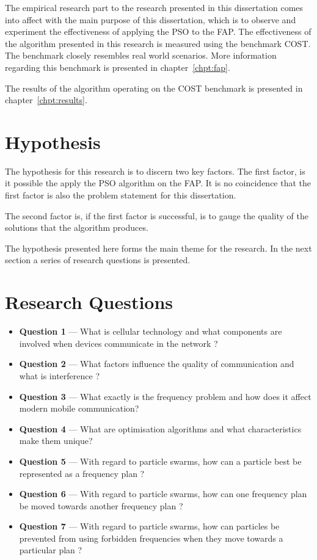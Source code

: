 The empirical research part to the research presented in this dissertation comes into affect with the main purpose of this dissertation, which is to observe and experiment the effectiveness of applying the \gls{PSO} to the \gls{FAP}. The effectiveness of the algorithm presented in this research is measured using the benchmark \gls{COST}. The benchmark closely resembles real world scenarios. More information regarding this benchmark is presented in chapter~\ref{chpt:fap}.

The results of the algorithm operating on the \gls{COST} benchmark is presented in chapter~\ref{chpt:results}. 
\section{Hypothesis}
The hypothesis for this research is to discern two key factors. The first factor, is it possible the apply the \gls{PSO} algorithm on the \gls{FAP}. It is no coincidence that the first factor is also the problem statement for this dissertation.

The second factor is, if the first factor is successful, is to gauge the quality of the solutions that the algorithm produces.

The hypothesis presented here forms the main theme for the research. In the next section a series of research questions is presented.
\section{Research Questions}
\begin{itemize}
\item \textbf{Question 1} --- What is cellular technology and what components are involved when devices communicate in the network ?
\item \textbf{Question 2} --- What factors influence the quality of communication and what is interference ?
\item \textbf{Question 3} --- What exactly is the frequency problem and how does it affect modern mobile communication?
\item \textbf{Question 4} --- What are optimisation algorithms and what characteristics make them unique?
\item \textbf{Question 5} --- With regard to particle swarms, how can a particle best be represented as a frequency plan ?
\item \textbf{Question 6} --- With regard to particle swarms, how can one frequency plan be moved towards another frequency plan ?
\item \textbf{Question 7} --- With regard to particle swarms, how can particles be prevented from using forbidden frequencies when they move towards a particular plan ?
\end{itemize}

